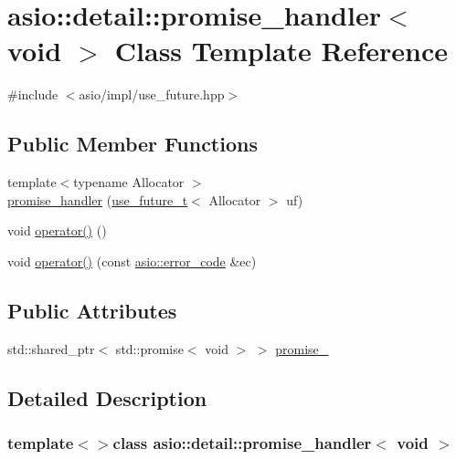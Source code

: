 \hypertarget{classasio_1_1detail_1_1promise__handler_3_01void_01_4}{}\section{asio\+:\+:detail\+:\+:promise\+\_\+handler$<$ void $>$ Class Template Reference}
\label{classasio_1_1detail_1_1promise__handler_3_01void_01_4}


{\ttfamily \#include $<$asio/impl/use\+\_\+future.\+hpp$>$}

\subsection*{Public Member Functions}
\begin{DoxyCompactItemize}
\item 
{\footnotesize template$<$typename Allocator $>$ }\\\hyperlink{classasio_1_1detail_1_1promise__handler_3_01void_01_4_ac3178752ee1769ccb9c4582904f54739}{promise\+\_\+handler} (\hyperlink{classasio_1_1use__future__t}{use\+\_\+future\+\_\+t}$<$ Allocator $>$ uf)
\item 
void \hyperlink{classasio_1_1detail_1_1promise__handler_3_01void_01_4_a872ccd203572d4125d33b27017c15941}{operator()} ()
\item 
void \hyperlink{classasio_1_1detail_1_1promise__handler_3_01void_01_4_a1f0c0fd9bcbba572abfe376c41721ffb}{operator()} (const \hyperlink{classasio_1_1error__code}{asio\+::error\+\_\+code} \&ec)
\end{DoxyCompactItemize}
\subsection*{Public Attributes}
\begin{DoxyCompactItemize}
\item 
std\+::shared\+\_\+ptr$<$ std\+::promise$<$ void $>$ $>$ \hyperlink{classasio_1_1detail_1_1promise__handler_3_01void_01_4_a707247d64f616a7295b79ad8086cef69}{promise\+\_\+}
\end{DoxyCompactItemize}


\subsection{Detailed Description}
\subsubsection*{template$<$$>$class asio\+::detail\+::promise\+\_\+handler$<$ void $>$}



